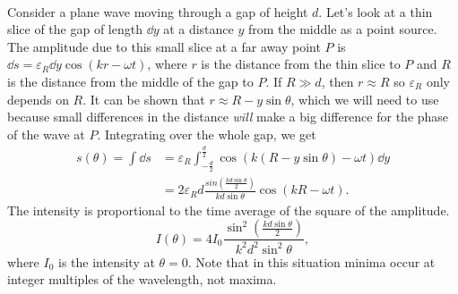 \documentclass[../classical_mechanics.tex]{subfiles}
\begin{document}
        \paragraph{}
        Consider a plane wave moving through a gap of height $d$.
        Let's look at a thin slice of the gap of length $\dd{y}$ at a distance $y$ from the middle as a point source.
        The amplitude due to this small slice at a far away point $P$ is $\dd{s}=\varepsilon_R\dd{y}\cos(kr-\omega t)$, where $r$ is the distance from the thin slice to $P$ and $R$ is the distance from the middle of the gap to $P$.
        If $R\gg d$, then $r\approx R$ so $\varepsilon_R$ only depends on $R$.
        It can be shown that $r\approx R-y\sin\theta$, which we will need to use because small differences in the distance \textit{will} make a big difference for the phase of the wave at $P$.
        Integrating over the whole gap, we get
        \begin{align}
            s(\theta)=\int\dd{s}&=\varepsilon_R\int_{-\frac{d}{2}}^{\frac{d}{2}}\cos(k(R-y\sin\theta)-\omega t)\dd{y}\\
            &=2\varepsilon_R d\frac{sin\left(\frac{kd\sin\theta}{2}\right)}{kd\sin\theta}\cos(kR-\omega t).
        \end{align}
        The intensity is proportional to the time average of the square of the amplitude.
        \begin{equation}
            I(\theta)=4I_0\frac{\sin^2\left(\frac{kd\sin\theta}{2}\right)}{k^2d^2\sin^2\theta},
        \end{equation}
        where $I_0$ is the intensity at $\theta=0$.
        Note that in this situation minima occur at integer multiples of the wavelength, not maxima.
\end{document}
